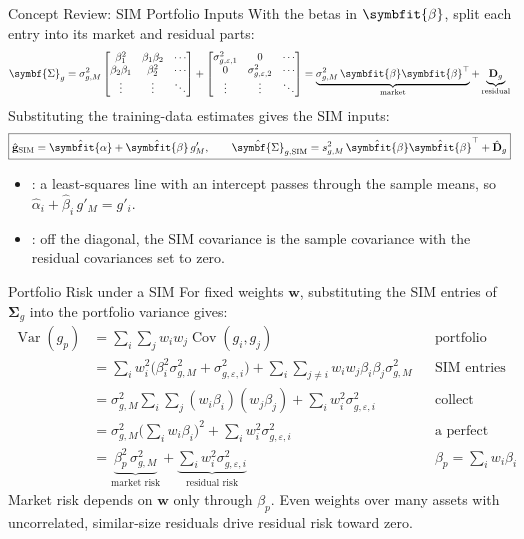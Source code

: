 \documentclass[aspectratio=169,11pt]{beamer}
\newcommand{\Var}{\operatorname{Var}}
\newcommand{\Cov}{\operatorname{Cov}}
\newcommand{\bg}{\mathbf{g}}
\newcommand{\bw}{\mathbf{w}}
\newcommand{\bal}{\symbfit{\alpha}}
\newcommand{\bbe}{\symbfit{\beta}}
\newcommand{\Dg}{\mathbf{D}_{g}}
\newcommand{\SigSIM}{\hat{\symbf{\Sigma}}_{g,\mathrm{SIM}}}
\newcommand{\gSIM}{\hat{\bg}_{\mathrm{SIM}}}
\begin{document}
\begin{frame}{Concept Review: SIM Portfolio Inputs}
  With the betas in $\bbe$, split each entry into its market and residual parts:
  \[
    \symbf{\Sigma}_g=\sigma^2_{g,M}\begin{bmatrix}\beta_1^2&\beta_1\beta_2&\cdots\\ \beta_2\beta_1&\beta_2^2&\cdots\\ \vdots&\vdots&\ddots\end{bmatrix}
    +\begin{bmatrix}\sigma^2_{g,\varepsilon,1}&0&\cdots\\ 0&\sigma^2_{g,\varepsilon,2}&\cdots\\ \vdots&\vdots&\ddots\end{bmatrix}
    =\underbrace{\sigma^2_{g,M}\,\bbe\bbe^{\top}}_{\text{market}}+\underbrace{\Dg}_{\text{residual}}
  \]
  Substituting the training-data estimates gives the SIM inputs:
  \[
    \boxed{\gSIM=\hat{\bal}+\hat{\bbe}\,g'_M,\qquad
      \SigSIM=s^2_{g,M}\,\hat{\bbe}\hat{\bbe}^{\top}+\hat{\mathbf D}_g}
  \]
  \begin{itemize}\setlength{\itemsep}{0.2em}
    \item {}: a least-squares line with an intercept passes
      through the sample means, so $\hat\alpha_i+\hat\beta_i\,g'_M=g'_i$.
    \item {}: off the diagonal, the SIM covariance is
      the sample covariance with the residual covariances set to zero.
  \end{itemize}
\end{frame}

\begin{frame}{Portfolio Risk under a SIM}
  For fixed weights $\bw$, substituting the SIM entries of $\symbf{\Sigma}_g$ into
  the portfolio variance gives:
  \[
    \begin{aligned}
      \Var(g_p)&=\textstyle\sum_{i}\sum_{j}w_iw_j\Cov(g_i,g_j)
        &&\text{portfolio variance (L6a)}\\
      &=\textstyle\sum_{i}w_i^2\bigl(\beta_i^2\sigma^2_{g,M}+\sigma^2_{g,\varepsilon,i}\bigr)
        +\sum_{i}\sum_{j\neq i}w_iw_j\beta_i\beta_j\sigma^2_{g,M}
        &&\text{SIM entries}\\
      &=\textstyle\sigma^2_{g,M}\sum_{i}\sum_{j}(w_i\beta_i)(w_j\beta_j)
        +\sum_{i}w_i^2\sigma^2_{g,\varepsilon,i}
        &&\text{collect market terms}\\
      &=\textstyle\sigma^2_{g,M}\bigl(\sum_{i}w_i\beta_i\bigr)^2
        +\sum_{i}w_i^2\sigma^2_{g,\varepsilon,i}
        &&\text{a perfect square}\\
      &=\underbrace{\beta_p^2\,\sigma^2_{g,M}}_{\text{market risk}}
        +\underbrace{\textstyle\sum_{i}w_i^2\sigma^2_{g,\varepsilon,i}}_{\text{residual risk}}
        &&\beta_p=\textstyle\sum_{i}w_i\beta_i
    \end{aligned}
  \]
  Market risk depends on $\bw$ only through $\beta_p$. Even weights over many
  assets with uncorrelated, similar-size residuals drive residual risk toward zero.
\end{frame}
\end{document}
